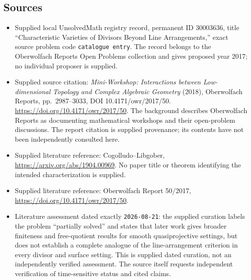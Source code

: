 \documentclass[11pt]{article}
\begin{document}
\subsection{Sources}
\begin{itemize}
\item Supplied local UnsolvedMath registry record, permanent ID \(30003636\), title ``Characteristic Varieties of Divisors Beyond Line Arrangements,'' exact source problem code \texttt{catalogue entry}. The record belongs to the Oberwolfach Reports Open Problems collection and gives proposed year 2017; no individual proposer is supplied.
\item Supplied source citation: \emph{Mini-Workshop: Interactions between Low-dimensional Topology and Complex Algebraic Geometry} (2018), Oberwolfach Reports, pp.~2987--3033, DOI 10.4171/owr/2017/50. \url{https://doi.org/10.4171/owr/2017/50}. The background describes Oberwolfach Reports as documenting mathematical workshops and their open-problem discussions. The report citation is supplied provenance; its contents have not been independently consulted here.
\item Supplied literature reference: Cogolludo--Libgober, \url{https://arxiv.org/abs/1904.00969}. No paper title or theorem identifying the intended characterization is supplied.
\item Supplied literature reference: Oberwolfach Report 50/2017, \url{https://doi.org/10.4171/owr/2017/50}.
\item Literature assessment dated exactly \texttt{2026-08-21}: the supplied curation labels the problem ``partially solved'' and states that later work gives broader finiteness and free-quotient results for smooth quasiprojective settings, but does not establish a complete analogue of the line-arrangement criterion in every divisor and surface setting. This is supplied dated curation, not an independently verified assessment. The source itself requests independent verification of time-sensitive status and cited claims.
\end{itemize}
\end{document}
